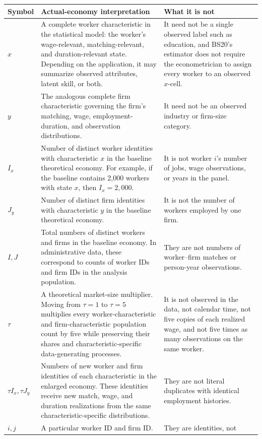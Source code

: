\documentclass[11pt]{article}
\begin{document}
\begin{longtable}{p{}p{}p{}}
\textbf{Symbol} & \textbf{Actual-economy interpretation} &
\textbf{What it is not} \\
\hline
\(x\) & A complete worker characteristic in the statistical model: the
worker's wage-relevant, matching-relevant, and duration-relevant state.
Depending on the application, it may summarize observed attributes, latent
skill, or both. & It need not be a single observed label such as education,
and BS20's estimator does not require the econometrician to assign every
worker to an observed \(x\)-cell. \\
\(y\) & The analogous complete firm characteristic governing the firm's
matching, wage, employment-duration, and observation distributions. & It
need not be an observed industry or firm-size category. \\
\(I_x\) & Number of distinct worker identities with characteristic \(x\) in
the baseline theoretical economy.  For example, if the baseline contains
2,000 workers with state \(x\), then \(I_x=2{,}000\). & It is not worker
\(i\)'s number of jobs, wage observations, or years in the panel. \\
\(J_y\) & Number of distinct firm identities with characteristic \(y\) in
the baseline theoretical economy. & It is not the number of workers employed
by one firm. \\
\(I,J\) & Total numbers of distinct workers and firms in the baseline
economy.  In administrative data, these correspond to counts of worker IDs
and firm IDs in the analysis population. & They are not numbers of
worker--firm matches or person-year observations. \\
\(\tau\) & A theoretical market-size multiplier.  Moving from \(\tau=1\)
to \(\tau=5\) multiplies every worker-characteristic and firm-characteristic
population count by five while preserving their shares and
characteristic-specific data-generating processes. & It is not observed in
the data, not calendar time, not five copies of each realized wage, and not
five times as many observations on the same worker. \\
\(\tau I_x,\tau J_y\) & Numbers of new worker and firm identities of each
characteristic in the enlarged economy.  These identities receive new match,
wage, and duration realizations from the same characteristic-specific
distributions. & They are not literal duplicates with identical employment
histories. \\
\(i,j\) & A particular worker ID and firm ID. & They are identities, not

\end{longtable}
\end{document}
